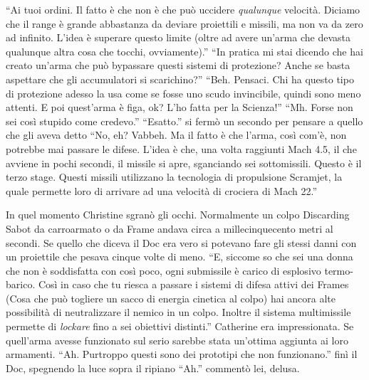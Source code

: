     ``Ai tuoi ordini. Il fatto è che non è che può uccidere \emph{qualunque} velocità. Diciamo che il range è grande
    abbastanza da deviare proiettili e missili, ma non va da zero ad infinito. L'idea è superare questo limite (oltre ad
    avere un'arma che devasta qualunque altra cosa che tocchi, ovviamente).'' ``In pratica mi stai dicendo che hai
    creato un'arma che può bypassare questi sistemi di protezione? Anche se basta aspettare che gli accumulatori si
    scarichino?'' ``Beh. Pensaci. Chi ha questo tipo di protezione adesso la usa come se fosse uno scudo invincibile,
    quindi sono meno attenti. E poi quest'arma è figa, ok? L'ho fatta per la Scienza!'' ``Mh. Forse non sei così
    stupido come credevo.'' ``Esatto.'' si fermò un secondo per pensare a quello che gli aveva detto ``No, eh? Vabbeh.
    Ma il fatto è che l'arma, così com'è, non potrebbe mai passare le difese. L'idea è che, una volta raggiunti Mach
    4.5, il che avviene in pochi secondi, il missile si apre, sganciando sei sottomissili. Questo è il terzo stage.
    Questi missili utilizzano la tecnologia di propulsione Scramjet, la quale permette loro di arrivare ad una velocità
    di crociera di Mach 22.''

    In quel momento Christine sgranò gli occhi. Normalmente un colpo Discarding Sabot da carroarmato o da Frame andava
    circa a millecinquecento metri al secondi. Se quello che diceva il Doc era vero si potevano fare gli stessi danni
    con un proiettile che pesava cinque volte di meno. ``E, siccome so che sei una donna che non è soddisfatta con così
    poco, ogni submissile è carico di esplosivo termo-barico. Così in caso che tu riesca a passare i sistemi di difesa
    attivi dei Frames (Cosa che può togliere un sacco di energia cinetica al colpo) hai ancora alte possibilità di
    neutralizzare il nemico in un colpo. Inoltre il sistema multimissile permette di \emph{lockare} fino a sei obiettivi
    distinti.'' Catherine era impressionata. Se quell'arma avesse funzionato sul serio sarebbe stata un'ottima aggiunta
    ai loro armamenti. ``Ah. Purtroppo questi sono dei prototipi che non funzionano.'' finì il Doc, spegnendo la luce
    sopra il ripiano ``Ah.'' commentò lei, delusa. 
